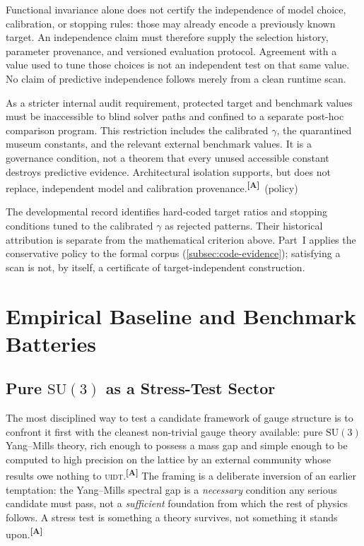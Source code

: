 \documentclass[12pt,a4paper,twoside]{article}
\theoremstyle{plain}
\theoremstyle{definition}
\theoremstyle{remark}
\newcommand{\UIDT}{\textsc{uidt}} %
\newcommand{\catmark}[1]{\textsuperscript{\textsf{\textbf{[#1]}}}}
\begin{document}
Functional invariance alone does not certify the independence of model choice,
calibration, or stopping rules: those may already encode a previously known
target. An independence claim must therefore supply the selection history,
parameter provenance, and versioned evaluation protocol. Agreement with a
value used to tune those choices is not an independent test on that same value.
No claim of predictive independence follows merely from a clean runtime scan.

\begin{governancebox}
As a stricter internal audit requirement, protected target and benchmark values
must be inaccessible to blind solver paths and confined to a separate post-hoc
comparison program. This restriction includes the calibrated $\gamma$, the
quarantined museum constants, and the relevant external benchmark values.
It is a governance condition, not a theorem that every unused accessible
constant destroys predictive evidence. Architectural isolation supports, but
does not replace, independent model and calibration provenance.\catmark{A}\ (policy)
\end{governancebox}

The developmental record identifies hard-coded target ratios and stopping
conditions tuned to the calibrated $\gamma$ as rejected patterns. Their
historical attribution is separate from the mathematical criterion above.
Part~I applies the conservative policy to the formal corpus
(\cref{subsec:code-evidence}); satisfying a scan is not, by itself, a
certificate of target-independent construction.

\newpage
\section{Empirical Baseline and Benchmark Batteries}
\label{sec:benchmark-batteries}

\subsection{Pure \texorpdfstring{$\mathrm{SU}(3)$}{SU(3)} as a Stress-Test Sector}
\label{subsec:su3-stress-test}

The most disciplined way to test a candidate framework of gauge
structure is to confront it first with the cleanest non-trivial gauge
theory available: pure $\mathrm{SU}(3)$ Yang--Mills theory, rich enough
to possess a mass gap and simple enough to be computed to high precision
on the lattice by an external community whose results owe nothing to
\UIDT.\catmark{A} The framing is a deliberate inversion of an earlier
temptation: the Yang--Mills spectral gap is a \emph{necessary} condition
any serious candidate must pass, not a \emph{sufficient} foundation from
which the rest of physics follows. A stress test is something a theory
survives, not something it stands upon.\catmark{A}
\end{document}
